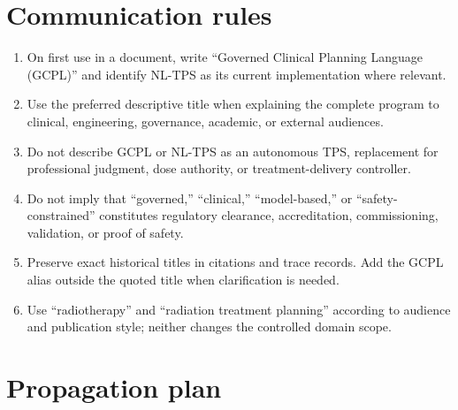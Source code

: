 \documentclass[11pt,letterpaper]{article}
\begin{document}
\section{Communication rules}

\begin{enumerate}
\item On first use in a document, write ``Governed Clinical Planning Language (GCPL)'' and identify NL-TPS as its current implementation where relevant.
\item Use the preferred descriptive title when explaining the complete program to clinical, engineering, governance, academic, or external audiences.
\item Do not describe GCPL or NL-TPS as an autonomous TPS, replacement for professional judgment, dose authority, or treatment-delivery controller.
\item Do not imply that ``governed,'' ``clinical,'' ``model-based,'' or ``safety-constrained'' constitutes regulatory clearance, accreditation, commissioning, validation, or proof of safety.
\item Preserve exact historical titles in citations and trace records. Add the GCPL alias outside the quoted title when clarification is needed.
\item Use ``radiotherapy'' and ``radiation treatment planning'' according to audience and publication style; neither changes the controlled domain scope.
\end{enumerate}

\section{Propagation plan}
\end{document}
